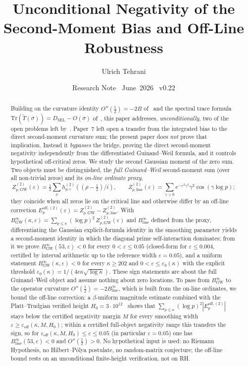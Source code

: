 \documentclass[11pt]{article}
\title{\vspace{-1.5em}\bfseries Unconditional Negativity of the
Second-Moment Bias and Off-Line Robustness}
\author{Ulrich Tehrani}
\date{Research Note \textperiodcentered\ June~2026
      \textperiodcentered\ v0.22}
\newcommand{\Tt}{\widetilde{T}}
\newcommand{\DSEL}{D_{\mathrm{SEL}}}
\newcommand{\BinfGW}{B_{\mathrm{GW}}^{\infty}}   %
\newcommand{\Binfline}{B_{\mathrm{line}}^{\infty}} %
\newcommand{\ZtwoGW}{Z_{p,\mathrm{GW}}^{(2)}}   %
\newcommand{\Ztwoline}{Z_{p,\mathrm{line}}^{(2)}} %
\newcommand{\Eoff}{E_p^{\mathrm{off},(2)}}  %
\begin{document}
\maketitle

\begin{abstract}
Building on the curvature identity $O''(\tfrac12)=-2B$ of~\cite{Paper6}
and the spectral trace formula $\mathrm{Tr}(\Tt(\sigma))=\DSEL-O(\sigma)$
of~\cite{Paper5}, this paper addresses, \emph{unconditionally}, two of the
open problems left by~\cite{Paper7}. Paper~7 left open a transfer from the
integrated bias to the direct second-moment curvature sum; the present paper
does \emph{not} prove that implication. Instead it \emph{bypasses} the
bridge, proving the direct second-moment negativity independently from the
differentiated Guinand--Weil formula, and it controls hypothetical
off-critical zeros.
We study the second Gaussian moment of the zero sum. Two objects must be
distinguished, the \emph{full Guinand--Weil} second-moment sum (over all
non-trivial zeros) and its \emph{on-line ordinate proxy},
\[
\ZtwoGW(\varepsilon)=\tfrac12\sum_\rho h^{(2)}_{p,\varepsilon}((\rho-\tfrac12)/i),
\qquad
\Ztwoline(\varepsilon)=\sum_{\gamma>0}e^{-\varepsilon^2\gamma^2}\gamma^2\cos(\gamma\log p);
\]
they coincide when all zeros lie on the critical line and otherwise differ by
an off-line correction $\Eoff(\varepsilon)=\ZtwoGW-\Ztwoline$.
With $\BinfGW(\kappa,\varepsilon)=\sum_{p\le\kappa}(\log p)^2\,\ZtwoGW(\varepsilon)$
and $\Binfline$ defined from the proxy, differentiating the Gaussian
explicit-formula identity in the smoothing parameter yields a second-moment
identity in which the diagonal prime self-interaction dominates; from it we
prove $\BinfGW(53,\varepsilon)<0$ for every $0<\varepsilon\le 0.05$
(closed-form for $\varepsilon\le 0.004$, certified by interval arithmetic up
to the reference width $\varepsilon=0.05$), and a uniform statement
$\BinfGW(\kappa,\varepsilon)<0$ for every $\kappa\ge 202$ and
$0<\varepsilon\le\varepsilon_0(\kappa)$ with the explicit threshold
$\varepsilon_0(\kappa)=1/(4e\kappa\sqrt{\log\kappa})$.
These sign statements are about the full Guinand--Weil object and assume
nothing about zero locations.
To pass from $\BinfGW$ to the operator curvature $O''(\tfrac12)=-2\Binfline$,
which is built from the on-line ordinates, we bound the off-line correction:
a $\beta$-uniform magnitude estimate combined with the Platt--Trudgian
verified height $H_0=3\cdot10^{12}$~\cite{PlattTrudgian21} shows that
$\sum_{p\le\kappa}(\log p)^2|\Eoff|$ stays below the certified negativity
margin $M$ for every smoothing width $\varepsilon\ge\varepsilon_{\mathrm{off}}(\kappa,M,H_0)$;
within a certified full-object negativity range this transfers the sign, so
for $\varepsilon_{\mathrm{off}}(\kappa,M,H_0)\le\varepsilon\le 0.05$ (in particular
$\varepsilon=0.05$) one has $\Binfline(53,\varepsilon)<0$ and
$O''(\tfrac12)>0$.
No hypothetical input is used: no Riemann Hypothesis, no Hilbert--P\'olya
postulate, no random-matrix conjecture; the off-line bound rests on an
unconditional finite-height verification, not on RH.


\end{abstract}
\end{document}
